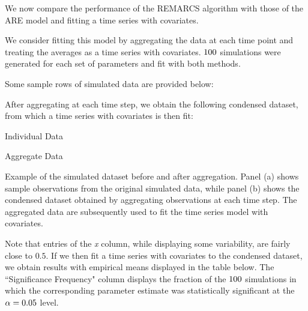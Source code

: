 
We now compare the performance of the REMARCS algorithm with those of 
the ARE model and fitting a time series with covariates.


We consider fitting this model by aggregating the data at each time point 
and treating the averages as a time series with covariates. $100$ 
simulations were generated for each set of parameters and fit with both methods.



Some sample rows of simulated data are provided below:


% 

After aggregating at each time step, we obtain the following condensed dataset, from which a time series with 
covariates is then fit:

% 

\begin{table}[htbp]
    \centering

    \begin{subtable}[t]{0.48\textwidth}
        \centering
        
        \caption{Individual Data}
        \label{tab:arma_cov_head}
    \end{subtable}
    \hfill
    \begin{subtable}[t]{0.48\textwidth}
        \centering
        
        \caption{Aggregate Data}
        \label{tab:arma_cov_head_daily}
    \end{subtable}

    \caption{Example of the simulated dataset before and after aggregation. Panel (a) shows sample observations from the original simulated data, while panel (b) shows the condensed dataset obtained by aggregating observations at each time step. The aggregated data are subsequently used to fit the time series model with covariates.}
    \label{tab:arma_cov_comparison}
\end{table}

Note that entries of the \textit{x} column, while displaying some variability, are fairly close to $0.5$. 
If we then fit a time series with covariates to the condensed dataset, we obtain results with empirical means 
displayed in the table below. The ``Significance Frequency" column displays the fraction of the $100$ 
simulations in which the corresponding parameter estimate was statistically significant at the $\alpha = 0.05$ 
level.


